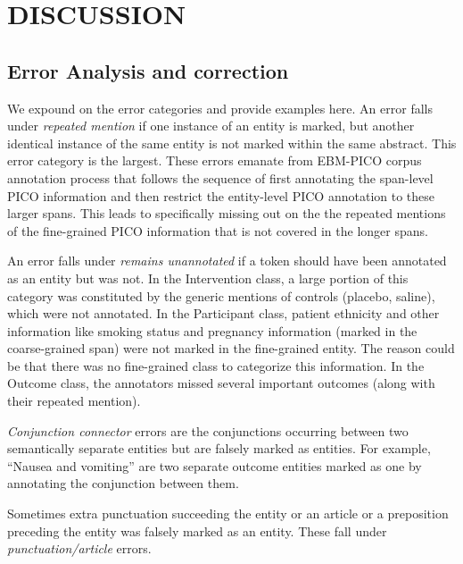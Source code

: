 \documentclass[10.7pt,]{article}
\begin{document}
%
%
%
\section{DISCUSSION}\label{discussion}
%
\subsection{Error Analysis and correction}\label{err_ana}
%
We expound on the error categories and provide examples here.
An error falls under \textit{repeated mention} if one instance of an entity is marked, but another identical instance of the same entity is not marked within the same abstract. 
This error category is the largest.
These errors emanate from EBM-PICO corpus annotation process that follows the sequence of first annotating the span-level PICO information and then restrict the entity-level PICO annotation to these larger spans.
This leads to specifically missing out on the the repeated mentions of the fine-grained PICO information that is not covered in the longer spans.

An error falls under \textit{remains unannotated} if a token should have been annotated as an entity but was not.
In the Intervention class, a large portion of this category was constituted by the generic mentions of controls (placebo, saline), which were not annotated.
In the Participant class, patient ethnicity and other information like smoking status and pregnancy information (marked in the coarse-grained span) were not marked in the fine-grained entity.
The reason could be that there was no fine-grained class to categorize this information. 
In the Outcome class, the annotators missed several important outcomes (along with their repeated mention).

\textit{Conjunction connector} errors are the conjunctions occurring between two semantically separate entities but are falsely marked as entities.
For example, ``Nausea and vomiting'' are two separate outcome entities marked as one by annotating the conjunction between them.

Sometimes extra punctuation succeeding the entity or an article or a preposition preceding the entity was falsely marked as an entity. These fall under \textit{punctuation/article} errors.
\end{document}
